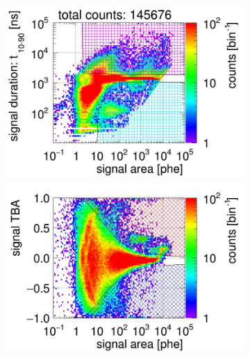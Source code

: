 \begin{landscape}%
	\begin{figure}[!p]
		\centering
		\begin{subfigure}[t]{0.33\textwidth} %
			\centering
			\includegraphics[width=\figurewidth,clip,trim={0 98 0 0}]{Figures/GasTest/CutsValid/res64771/pdpa22Vecfig64771.jpg}
			\includegraphics[width=\figurewidth,clip,trim={0 0 0 40}]{Figures/GasTest/CutsValid/res64771/tbapa22Vecfig64771.jpg}
			\caption{}
			\label{fig:signal selection dv 16 01}
		\end{subfigure}
		\begin{subfigure}[t]{0.33\textwidth}
			\centering

\end{subfigure}
\end{figure}
\end{landscape}

